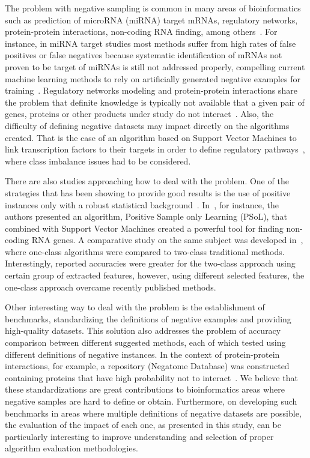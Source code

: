 \documentclass[conference]{IEEEtran}
\begin{document}
The problem with negative sampling is common in many areas of bioinformatics such as prediction of microRNA (miRNA) target mRNAs, regulatory networks, protein-protein interactions, non-coding RNA finding, among others~\cite{bandyopadhyay2009,cerulo2010,park2011,wang2006}. For instance, in miRNA target studies most methods suffer from high rates of false positives or false negatives because systematic identification of mRNAs not proven to be target of miRNAs is still not addressed properly, compelling current machine learning methods to rely on artificially generated negative examples for training~\cite{bandyopadhyay2009}. Regulatory networks modeling and protein-protein interactions share the problem that definite knowledge is typically not available that a given pair of genes, proteins or other products under study do not interact~\cite{cerulo2010,park2011}. Also, the difficulty of defining negative datasets may impact directly on the algorithms created. That is the case of an algorithm based on Support Vector Machines to link transcription factors to their targets in order to define regulatory pathways~\cite{qian2003}, where class imbalance issues had to be considered.

There are also studies approaching how to deal with the problem. One of the strategies that has been showing to provide good results is the use of positive instances only with a robust statistical background~\cite{cerulo2010,wang2006,yousef2008}. In~\cite{wang2006}, for instance, the authors presented an algorithm, Positive Sample only Learning (PSoL), that combined with Support Vector Machines created a powerful tool for finding non-coding RNA genes. A comparative study on the same subject was developed in~\cite{yousef2008}, where one-class algorithms were compared to two-class traditional methods. Interestingly, reported accuracies were greater for the two-class approach using certain group of extracted features, however, using different selected features, the one-class approach overcame recently published methods.

Other interesting way to deal with the problem is the establishment of benchmarks, standardizing the definitions of negative examples and providing high-quality datasets. This solution also addresses the problem of accuracy comparison between different suggested methods, each of which tested using different definitions of negative instances. In the context of protein-protein interactions, for example, a repository (Negatome Database) was constructed containing proteins that have high probability not to interact~\cite{smialowski2010}. We believe that these standardizations are great contributions to bioinformatics areas where negative samples are hard to define or obtain. Furthermore, on developing such benchmarks in areas where multiple definitions of negative datasets are possible, the evaluation of the impact of each one, as presented in this study, can be particularly interesting to improve understanding and selection of proper algorithm evaluation methodologies.
\end{document}
